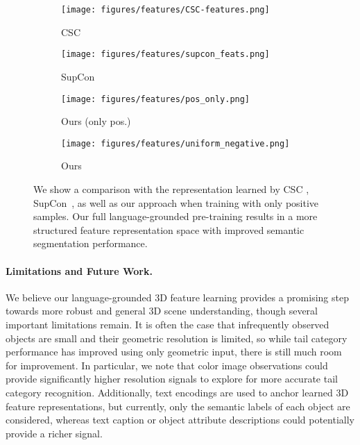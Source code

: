 \begin{figure}[!ht]
    \centering
\begin{subfigure}[c]{.24\linewidth}
        \texttt{[image: figures/features/CSC-features.png]}
        \caption{CSC~\cite{scene_contrast}}
    \end{subfigure}
\begin{subfigure}[c]{.24\linewidth}
        \texttt{[image: figures/features/supcon\_feats.png]}
        \caption{SupCon~\cite{supcontrast}}
    \end{subfigure}
\begin{subfigure}[c]{.24\linewidth}
        \texttt{[image: figures/features/pos\_only.png]}
        \caption{Ours (only pos.)}
    \end{subfigure}
\begin{subfigure}[c]{.24\linewidth}
        \texttt{[image: figures/features/uniform\_negative.png]}
        \caption{Ours}
    \end{subfigure}
\caption{We show a comparison with the representation learned by CSC \cite{scene_contrast}, SupCon~\cite{supcontrast}, as well as our approach when training with only positive samples. Our full language-grounded pre-training results in a more structured feature representation space with improved semantic segmentation performance.}
    \label{fig:representation_spaces}
\end{figure}

\paragraph{Limitations and Future Work.}
We believe our language-grounded 3D feature learning provides a promising step towards more robust and general 3D scene understanding, though several important limitations remain.
It is often the case that infrequently observed objects are small and their geometric resolution is limited, so while tail category performance has improved using only geometric input, there is still much room for improvement.
In particular, we note that color image observations could provide significantly higher resolution signals to explore for more accurate tail category recognition.
Additionally, text encodings are used to anchor learned 3D feature representations, but currently, only the semantic labels of each object are considered, whereas text caption or object attribute descriptions could potentially provide a richer signal.
